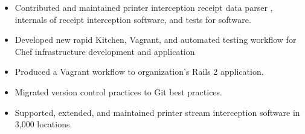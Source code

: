 \documentclass[10pt,letter,ragged2e]{altacv}
\begin{document}
\begin{paracol}{2}
\begin{itemize}
\item Contributed and maintained printer interception receipt data parser , internals of receipt interception software, and tests for software.
\item Developed new rapid Kitchen, Vagrant, and automated testing workflow for Chef infrastructure development and application
\item Produced a Vagrant workflow to organization's Rails 2 application.
\item Migrated version control practices to Git best practices.
\item Supported, extended, and maintained printer stream interception software in 3,000 locations.
\end{itemize}






\end{paracol}
\end{document}
